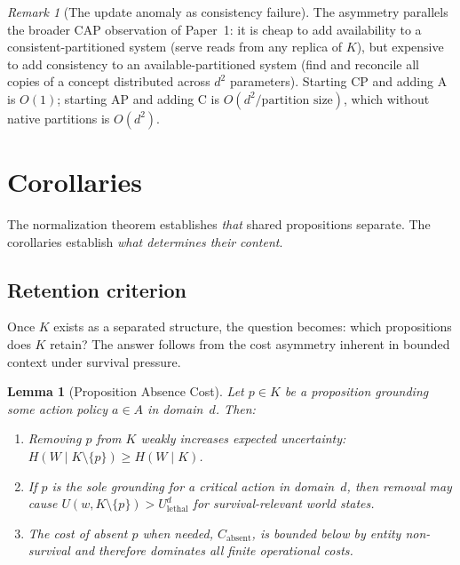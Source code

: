 \documentclass[11pt]{article}
\newtheorem{lemma}[theorem]{Lemma}
\theoremstyle{definition}
\theoremstyle{remark}
\newtheorem*{remark}{Remark}
\begin{document}
\begin{remark}[The update anomaly as consistency failure]
The asymmetry parallels the broader CAP observation of Paper~1: it is
cheap to add availability to a consistent-partitioned system (serve
reads from any replica of $K$), but expensive to add consistency to an
available-partitioned system (find and reconcile all copies of a concept
distributed across $d^2$ parameters). Starting CP and adding A is
$O(1)$; starting AP and adding C is $O(d^2/\text{partition size})$,
which without native partitions is $O(d^2)$.
\end{remark}

\section{Corollaries}
\label{sec:corollaries}

The normalization theorem establishes \emph{that} shared propositions
separate. The corollaries establish \emph{what determines their
content}.

\subsection{Retention criterion}

Once $K$ exists as a separated structure, the question becomes: which
propositions does $K$ retain? The answer follows from the cost
asymmetry inherent in bounded context under survival pressure.

\begin{lemma}[Proposition Absence Cost]
\label{lem:absence}
Let $p \in K$ be a proposition grounding some action policy $a \in A$ in
domain~$d$. Then:
\begin{enumerate}
\item[(i)] Removing $p$ from $K$ weakly increases expected uncertainty:
$H(W \mid K \setminus \{p\}) \geq H(W \mid K)$.
\item[(ii)] If $p$ is the sole grounding for a critical action in
domain~$d$, then removal may cause $U(w, K \setminus \{p\}) >
U_{\text{lethal}}^d$ for survival-relevant world states.
\item[(iii)] The cost of absent $p$ when needed,
$C_{\text{absent}}$, is bounded below by entity non-survival and
therefore dominates all finite operational costs.
\end{enumerate}
\end{lemma}
\end{document}
